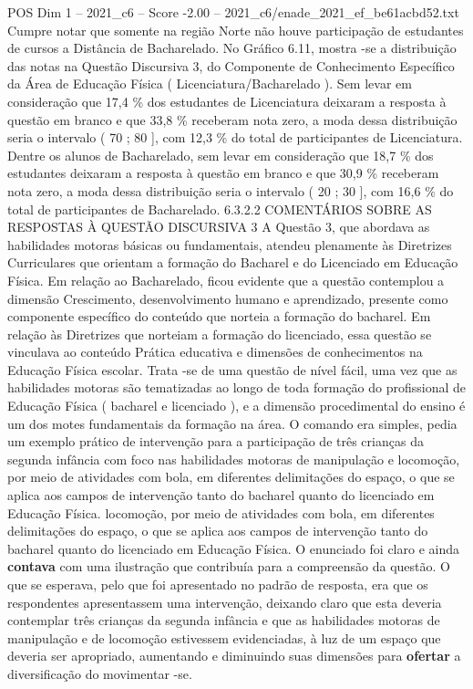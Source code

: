 \begin{textsample}{POS Dim 1 – 2021\_c6 – Score -2.00 – 2021\_c6/enade\_2021\_ef\_be61acbd52.txt}
Cumpre notar que somente na região Norte não houve participação de estudantes de cursos a Distância de Bacharelado.
No Gráfico 6.11, mostra -se a distribuição das notas na Questão Discursiva 3, do Componente de Conhecimento Específico da Área de Educação Física ( Licenciatura/Bacharelado ).
Sem levar em consideração que 17,4 \% dos estudantes de Licenciatura deixaram a resposta à questão em branco e que 33,8 \% receberam nota zero, a moda dessa distribuição seria o intervalo ( 70 ; 80 ], com 12,3 \% do total de participantes de Licenciatura.
Dentre os alunos de Bacharelado, sem levar em consideração que 18,7 \% dos estudantes deixaram a resposta à questão em branco e que 30,9 \% receberam nota zero, a moda dessa distribuição seria o intervalo ( 20 ; 30 ], com 16,6 \% do total de participantes de Bacharelado. 6.3.2.2 COMENTÁRIOS SOBRE AS RESPOSTAS À QUESTÃO DISCURSIVA 3 A Questão 3, que abordava as habilidades motoras básicas ou fundamentais, atendeu plenamente às Diretrizes Curriculares que orientam a formação do Bacharel e do Licenciado em Educação Física.
Em relação ao Bacharelado, ficou evidente que a questão contemplou a dimensão Crescimento, desenvolvimento humano e aprendizado, presente como componente específico do conteúdo que norteia a formação do bacharel.
Em relação às Diretrizes que norteiam a formação do licenciado, essa questão se vinculava ao conteúdo Prática educativa e dimensões de conhecimentos na Educação Física escolar.
Trata -se de uma questão de nível fácil, uma vez que as habilidades motoras são tematizadas ao longo de toda formação do profissional de Educação Física ( bacharel e licenciado ), e a dimensão procedimental do ensino é um dos motes fundamentais da formação na área.
O comando era simples, pedia um exemplo prático de intervenção para a participação de três crianças da segunda infância com foco nas habilidades motoras de manipulação e locomoção, por meio de atividades com bola, em diferentes delimitações do espaço, o que se aplica aos campos de intervenção tanto do bacharel quanto do licenciado em Educação Física. locomoção, por meio de atividades com bola, em diferentes delimitações do espaço, o que se aplica aos campos de intervenção tanto do bacharel quanto do licenciado em Educação Física.
O enunciado foi claro e ainda \textbf{contava} com uma ilustração que contribuía para a compreensão da questão.
O que se esperava, pelo que foi apresentado no padrão de resposta, era que os respondentes apresentassem uma intervenção, deixando claro que esta deveria contemplar três crianças da segunda infância e que as habilidades motoras de manipulação e de locomoção estivessem evidenciadas, à luz de um espaço que deveria ser apropriado, aumentando e diminuindo suas dimensões para \textbf{ofertar} a diversificação do movimentar -se.

\end{textsample}
